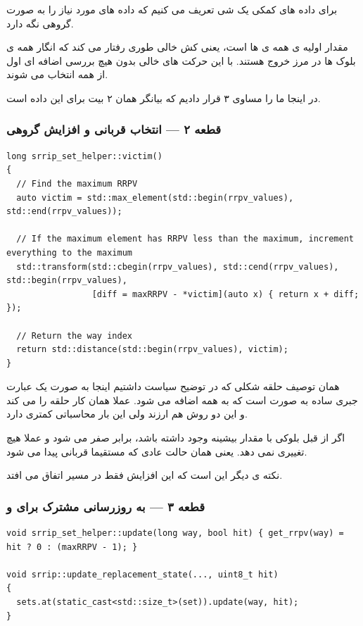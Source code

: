\documentclass[12pt,a4paper]{article}
\begin{document}
برای داده های کمکی یک شی  تعریف می کنیم که داده های مورد نیاز را به صورت گروهی نگه دارد.

مقدار اولیه ی همه ی  ها  است، یعنی کش خالی طوری رفتار می کند که انگار همه ی بلوک ها در مرز خروج هستند. با این حرکت  های خالی بدون هیچ بررسی اضافه ای اول از همه انتخاب می شوند.

در اینجا ما  را مساوی ۳ قرار دادیم که بیانگر همان ۲ بیت برای این داده است.

\subsubsection{قطعه ۲ — انتخاب قربانی و افزایش گروهی}

\begin{latin}
\begin{lstlisting}
long srrip_set_helper::victim()
{
  // Find the maximum RRPV
  auto victim = std::max_element(std::begin(rrpv_values), std::end(rrpv_values));

  // If the maximum element has RRPV less than the maximum, increment everything to the maximum
  std::transform(std::cbegin(rrpv_values), std::cend(rrpv_values), std::begin(rrpv_values),
                 [diff = maxRRPV - *victim](auto x) { return x + diff; });

  // Return the way index
  return std::distance(std::begin(rrpv_values), victim);
}
\end{lstlisting}
\end{latin}

همان توصیف حلقه شکلی که در توضیح سیاست داشتیم اینجا به صورت یک عبارت جبری ساده به صورت  است که به همه اضافه می شود. عملا همان کار حلقه را می کند و این دو روش هم ارزند ولی این بار محاسباتی کمتری دارد.

اگر از قبل بلوکی با مقدار بیشینه وجود داشته باشد،  برابر صفر می شود و  عملا هیچ تغییری نمی دهد. یعنی همان حالت عادی که مستقیما قربانی پیدا می شود.

نکته ی دیگر این است که این افزایش فقط در مسیر  اتفاق می افتد.

\subsubsection{قطعه ۳ — به روزرسانی مشترک برای  و }

\begin{latin}
\begin{lstlisting}
void srrip_set_helper::update(long way, bool hit) { get_rrpv(way) = hit ? 0 : (maxRRPV - 1); }

void srrip::update_replacement_state(..., uint8_t hit)
{
  sets.at(static_cast<std::size_t>(set)).update(way, hit);
}
\end{lstlisting}
\end{latin}
\end{document}
